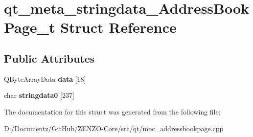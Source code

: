 \hypertarget{structqt__meta__stringdata___address_book_page__t}{}\section{qt\+\_\+meta\+\_\+stringdata\+\_\+\+Address\+Book\+Page\+\_\+t Struct Reference}
\label{structqt__meta__stringdata___address_book_page__t}
\subsection*{Public Attributes}
\begin{DoxyCompactItemize}
\item 
\mbox{\label{structqt__meta__stringdata___address_book_page__t_a02ce1730a81d276b38a27dbb68327a97}} 
Q\+Byte\+Array\+Data {\bfseries data} \mbox{[}18\mbox{]}
\item 
\mbox{\label{structqt__meta__stringdata___address_book_page__t_a49b4c88504177dc9a2be2f265b6cdec1}} 
char {\bfseries stringdata0} \mbox{[}237\mbox{]}
\end{DoxyCompactItemize}


The documentation for this struct was generated from the following file\+:\begin{DoxyCompactItemize}
\item 
D\+:/\+Documentz/\+Git\+Hub/\+Z\+E\+N\+Z\+O-\/\+Core/src/qt/moc\+\_\+addressbookpage.\+cpp\end{DoxyCompactItemize}
